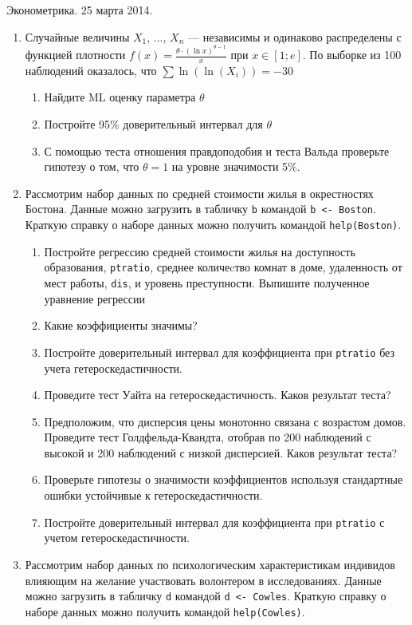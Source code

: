\documentclass[12pt,a4paper]{article}
\begin{document}
Эконометрика. 25 марта 2014.

\begin{enumerate}
\item  Случайные величины $X_{1}$, ..., $X_{n}$ --- независимы и одинаково распределены с функцией плотности $f(x)=\frac{\theta \cdot\left(\ln x\right)^{\theta -1}}{x} $  при  $x\in
\left[1;e\right]$. По выборке из 100 наблюдений оказалось, что $\sum{\ln(\ln(X_{i}))}=-30$ 
\begin{enumerate}
\item Найдите ML оценку параметра $\theta$
\item Постройте 95\% доверительный интервал для $\theta$
\item С помощью теста отношения правдоподобия и теста Вальда проверьте гипотезу о том, что $\theta=1$ на уровне значимости 5\%. 
\end{enumerate}


\item Рассмотрим набор данных по средней стоимости жилья в окрестностях Бостона. Данные можно загрузить в табличку \verb|b| командой \verb|b <- Boston|. Краткую справку о наборе данных можно получить командой \verb|help(Boston)|.
\begin{enumerate}
\item Постройте регрессию средней стоимости жилья на доступность образования, \verb|ptratio|, среднее количеcтво комнат в доме, удаленность от мест работы, \verb|dis|, и уровень преступности. Выпишите полученное уравнение регрессии
\item Какие коэффициенты значимы?
\item Постройте доверительный интервал для коэффициента при \verb|ptratio| без учета гетероскедастичности.
\item Проведите тест Уайта на гетероскедастичность. Каков результат теста?
\item Предположим, что дисперсия цены монотонно связана с возрастом домов. Проведите тест Голдфельда-Квандта, отобрав по 200 наблюдений с высокой и 200 наблюдений с низкой дисперсией. Каков результат теста?
\item Проверьте гипотезы о значимости коэффициентов используя стандартные ошибки устойчивые к гетероскедастичности.
\item Постройте доверительный интервал для коэффициента при \verb|ptratio| с учетом гетероскедастичности.
\end{enumerate}

\item Рассмотрим набор данных по психологическим характеристикам индивидов влияющим на желание участвовать волонтером в исследованиях. Данные можно загрузить в табличку \verb|d| командой \verb|d <- Cowles|. Краткую справку о наборе данных можно получить командой \verb|help(Cowles)|.


\end{enumerate}
\end{document}
